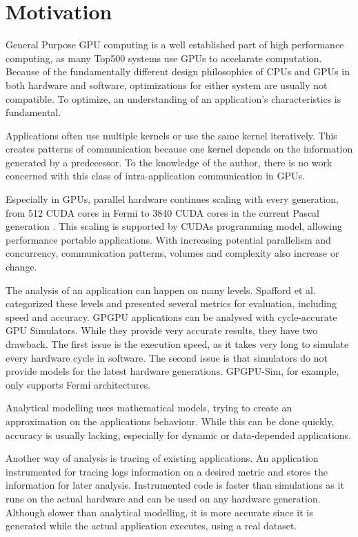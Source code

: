 \chapter{Motivation}
General Purpose GPU computing is a well established part of high performance computing, as many Top500 
systems \cite{Top500} use GPUs to accelarate computation. Because of the fundamentally different design philosophies of CPUs
and GPUs in both hardware and software, optimizations for either system are usually not compatible. To optimize, an
understanding of an application's characteristics is fundamental.

Applications often use multiple kernels or use the same kernel iteratively. This creates patterns of communication because one kernel depends on the information generated by a predecessor. To the knowledge of the author, there is no
work concerned with this class of intra-application communication in GPUs.

Especially in GPUs, parallel hardware continues scaling with every generation, from 512 CUDA cores in Fermi  \cite{FermiPaper} to 3840 CUDA cores in the current Pascal generation \cite{PascalPaper}. This scaling is supported by CUDAs programming model, allowing performance portable applications. With increasing potential parallelism and concurrency, communication patterns, volumes and complexity also increase or change.

The analysis of an application can happen on many levels. Spafford et al. \cite{Spafford:2012:ADS:2388996.2389110} categorized these levels and presented several 
metrics for evaluation, including speed and accuracy. GPGPU applications can be analysed with cycle-accurate GPU Simulators. While they provide very accurate results, they have two drawback. 
The first issue is the execution speed, as it takes very long to simulate every hardware cycle in software. 
The second issue is that simulators do not provide models for the latest hardware generations. GPGPU-Sim, for example, only supports Fermi architectures. \cite{gpgpu}

Analytical modelling uses mathematical models, trying to create an approximation on the applications behaviour.
While this can be done quickly, accuracy is usually lacking, especially for dynamic or data-depended applications.

Another way of analysis is tracing of existing applications. An application instrumented for tracing logs information on a desired metric and stores the information for later analysis. Instrumented code is faster than simulations as it runs on the actual hardware and can be used on any hardware generation. Although slower than analytical modelling, it is  more accurate since it is generated while the actual application executes, using a real dataset.


